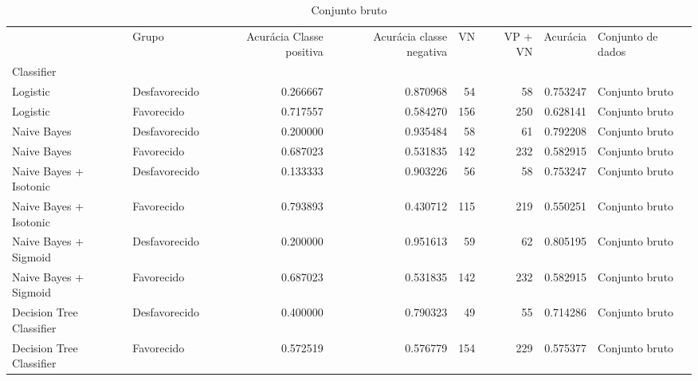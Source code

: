 \begin{table}
\centering
\caption{Conjunto bruto}
\label{Conjunto bruto 3}
\begin{tabular}{llrrrrrl}
\toprule
{} &          Grupo &  Acurácia Classe positiva &  Acurácia classe negativa &  VN  &  VP + VN  &  Acurácia & Conjunto de dados \\
Classifier               &                &                           &                           &      &           &           &                   \\
\midrule
Logistic                 &  Desfavorecido &                  0.266667 &                  0.870968 &   54 &        58 &  0.753247 &    Conjunto bruto \\
Logistic                 &     Favorecido &                  0.717557 &                  0.584270 &  156 &       250 &  0.628141 &    Conjunto bruto \\
Naive Bayes              &  Desfavorecido &                  0.200000 &                  0.935484 &   58 &        61 &  0.792208 &    Conjunto bruto \\
Naive Bayes              &     Favorecido &                  0.687023 &                  0.531835 &  142 &       232 &  0.582915 &    Conjunto bruto \\
Naive Bayes + Isotonic   &  Desfavorecido &                  0.133333 &                  0.903226 &   56 &        58 &  0.753247 &    Conjunto bruto \\
Naive Bayes + Isotonic   &     Favorecido &                  0.793893 &                  0.430712 &  115 &       219 &  0.550251 &    Conjunto bruto \\
Naive Bayes + Sigmoid    &  Desfavorecido &                  0.200000 &                  0.951613 &   59 &        62 &  0.805195 &    Conjunto bruto \\
Naive Bayes + Sigmoid    &     Favorecido &                  0.687023 &                  0.531835 &  142 &       232 &  0.582915 &    Conjunto bruto \\
Decision Tree Classifier &  Desfavorecido &                  0.400000 &                  0.790323 &   49 &        55 &  0.714286 &    Conjunto bruto \\
Decision Tree Classifier &     Favorecido &                  0.572519 &                  0.576779 &  154 &       229 &  0.575377 &    Conjunto bruto \\
\bottomrule
\end{tabular}
\end{table}
